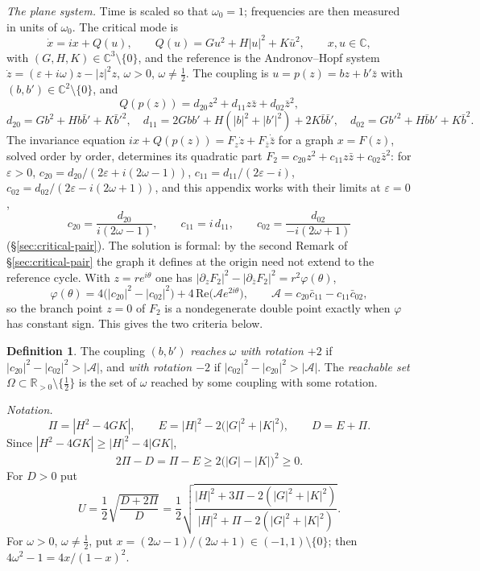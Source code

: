 \documentclass[11pt,reqno]{amsart}
\theoremstyle{plain}
\theoremstyle{definition}
\newtheorem*{definition}{Definition}
\theoremstyle{remark}
\newcommand{\R}{\mathbb{R}}
\newcommand{\C}{\mathbb{C}}
\begin{document}
\medskip\noindent\emph{The plane system.}
Time is scaled so that $\omega_0=1$; frequencies are then measured in units of $\omega_0$. The
critical mode is
\[
  \dot x=ix+Q(u),\qquad Q(u)=Gu^{2}+H|u|^{2}+K\bar u^{2},\qquad x,u\in\C,
\]
with $(G,H,K)\in\C^{3}\setminus\{0\}$, and the reference is the Andronov--Hopf system
$\dot z=(\varepsilon+i\omega)z-|z|^{2}z$, $\omega>0$, $\omega\ne\frac12$. The coupling is
$u=p(z)=bz+b'\bar z$ with $(b,b')\in\C^{2}\setminus\{0\}$, and
\[
  Q(p(z))=d_{20}z^{2}+d_{11}z\bar z+d_{02}\bar z^{2},
\]
\[
  d_{20}=Gb^{2}+Hb\bar b'+K\bar b'^{2},\quad
  d_{11}=2Gbb'+H(|b|^{2}+|b'|^{2})+2K\bar b\bar b',\quad
  d_{02}=Gb'^{2}+H\bar bb'+K\bar b^{2}.
\]
The invariance equation $ix+Q(p(z))=F_z\dot z+F_{\bar z}\dot{\bar z}$ for a graph $x=F(z)$,
solved order by order, determines its quadratic part
$F_2=c_{20}z^{2}+c_{11}z\bar z+c_{02}\bar z^{2}$: for $\varepsilon>0$,
$c_{20}=d_{20}/(2\varepsilon+i(2\omega-1))$, $c_{11}=d_{11}/(2\varepsilon-i)$,
$c_{02}=d_{02}/(2\varepsilon-i(2\omega+1))$, and this appendix works with their limits at $\varepsilon=0$,
\[
  c_{20}=\frac{d_{20}}{i(2\omega-1)},\qquad c_{11}=i\,d_{11},\qquad c_{02}=\frac{d_{02}}{-i(2\omega+1)}
\]
(\S\ref{sec:critical-pair}). The solution is formal: by the second Remark of \S\ref{sec:critical-pair} the graph it defines at the origin
need not extend to the reference cycle. With $z=re^{i\theta}$ one has
$|\partial_zF_2|^{2}-|\partial_{\bar z}F_2|^{2}=r^{2}\varphi(\theta)$,
\[
  \varphi(\theta)=4\bigl(|c_{20}|^{2}-|c_{02}|^{2}\bigr)+4\,\mathrm{Re}\bigl(\mathcal A e^{2i\theta}\bigr),\qquad
  \mathcal A=c_{20}\bar c_{11}-c_{11}\bar c_{02},
\]
so the branch point $z=0$ of $F_2$ is a nondegenerate double point exactly when $\varphi$ has constant
sign. This gives the two criteria below.

\begin{definition}
The coupling $(b,b')$ \emph{reaches} $\omega$ \emph{with rotation $+2$} if
$|c_{20}|^{2}-|c_{02}|^{2}>|\mathcal A|$, and \emph{with rotation $-2$} if
$|c_{02}|^{2}-|c_{20}|^{2}>|\mathcal A|$. The \emph{reachable set} $\Omega\subset\R_{>0}\setminus\{\frac12\}$
is the set of $\omega$ reached by some coupling with some rotation.
\end{definition}

\medskip\noindent\emph{Notation.}
\[
  \Pi=|H^{2}-4GK|,\qquad E=|H|^{2}-2\bigl(|G|^{2}+|K|^{2}\bigr),\qquad D=E+\Pi .
\]
Since $|H^{2}-4GK|\ge|H|^{2}-4|GK|$,
\begin{equation}\label{eq:app-PiE}
  2\Pi-D=\Pi-E\ge2\bigl(|G|-|K|\bigr)^{2}\ge0 .
\end{equation}
For $D>0$ put
\begin{equation}\label{eq:app-U}
  U=\frac12\sqrt{\frac{D+2\Pi}{D}}
  =\frac12\sqrt{\frac{|H|^{2}+3\Pi-2(|G|^{2}+|K|^{2})}{|H|^{2}+\Pi-2(|G|^{2}+|K|^{2})}} .
\end{equation}
For $\omega>0$, $\omega\ne\frac12$, put $x=(2\omega-1)/(2\omega+1)\in(-1,1)\setminus\{0\}$; then
$4\omega^{2}-1=4x/(1-x)^{2}$.
\end{document}
